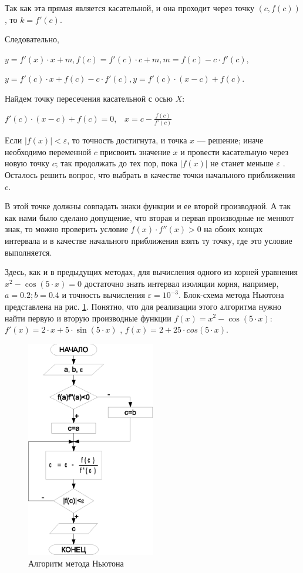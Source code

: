 Так как эта прямая является касательной, и она проходит через точку  $(c,f(c))$, то  $k=f'(c)$. 

Следовательно, 

$y=f'(x)\cdot x+m,f(c)=f'(c)\cdot c+m,m=f(c)-c\cdot f'(c),$

 $y=f'(c)\cdot x+f(c)-c\cdot f'(c),y=f'(c)\cdot (x-c)+f(c)$.

Найдем точку пересечения касательной с осью $X$:

 $f'(c)\cdot (x-c)+f(c)=0$,\ \ ${x=c-\frac{f(c)}{f'(c)}}$  

Если  $|f(x)|<\varepsilon$, то точность достигнута, и точка $x$ --- решение; иначе необходимо переменной
$c$ присвоить значение $x$ и провести касательную через новую точку
$c$; так продолжать до тех пор, пока  $|f(x)|$  не станет меньше  $\varepsilon$ . Осталось решить
вопрос, что выбрать в качестве точки начального приближения $c$.

В этой точке должны совпадать знаки функции и ее второй производной. А так как нами было сделано допущение, что вторая и
первая производные не меняют знак, то можно проверить условие  $f(x)\cdot f''(x)>0$ на обоих 
концах интервала и в качестве начального приближения взять ту точку, где это условие
выполняется.

Здесь, как и в предыдущих методах, для вычисления одного из корней уравнения  $x^2-\cos (5\cdot x)=0$  достаточно
знать интервал изоляции корня, например,  $a=0.2;b=0.4$  и точность вычисления  $\varepsilon=10^{-3}$. Блок-схема
метода Ньютона представлена на рис. \ref{ch04:refDrawing7}. Понятно, что для реализации этого алгоритма нужно найти первую и
вторую производные функции  $f(x)=x^2-\cos (5\cdot x)$:  $f'(x)=2\cdot x+5\cdot \sin (5\cdot x)$ , 
$f(x) =2 +25 \cdot cos(5 \cdot x)$.

\begin{figure}[htb]
\begin{center}
\includegraphics[width=0.5\textwidth]{img/ris_4_8}
\caption{Алгоритм метода Ньютона}
\label{ch04:refDrawing7}
\end{center}
\end{figure}

